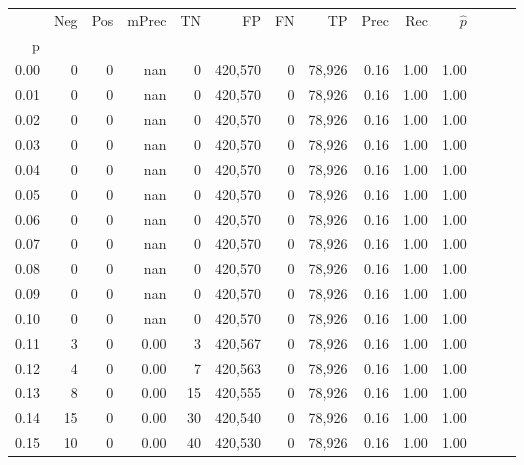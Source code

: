 \begin{tabular}{rrrrrrrrrrrrrr}
\toprule
{} &     Neg &    Pos & mPrec &       TN &       FP &      FN &      TP &  Prec &   Rec & $\hat{p}$ \\
p    &         &        &       &          &          &         &         &       &       &           \\
\midrule
0.00 &       0 &      0 &   nan &        0 &  420,570 &       0 &  78,926 &  0.16 &  1.00 &      1.00 \\
0.01 &       0 &      0 &   nan &        0 &  420,570 &       0 &  78,926 &  0.16 &  1.00 &      1.00 \\
0.02 &       0 &      0 &   nan &        0 &  420,570 &       0 &  78,926 &  0.16 &  1.00 &      1.00 \\
0.03 &       0 &      0 &   nan &        0 &  420,570 &       0 &  78,926 &  0.16 &  1.00 &      1.00 \\
0.04 &       0 &      0 &   nan &        0 &  420,570 &       0 &  78,926 &  0.16 &  1.00 &      1.00 \\
0.05 &       0 &      0 &   nan &        0 &  420,570 &       0 &  78,926 &  0.16 &  1.00 &      1.00 \\
0.06 &       0 &      0 &   nan &        0 &  420,570 &       0 &  78,926 &  0.16 &  1.00 &      1.00 \\
0.07 &       0 &      0 &   nan &        0 &  420,570 &       0 &  78,926 &  0.16 &  1.00 &      1.00 \\
0.08 &       0 &      0 &   nan &        0 &  420,570 &       0 &  78,926 &  0.16 &  1.00 &      1.00 \\
0.09 &       0 &      0 &   nan &        0 &  420,570 &       0 &  78,926 &  0.16 &  1.00 &      1.00 \\
0.10 &       0 &      0 &   nan &        0 &  420,570 &       0 &  78,926 &  0.16 &  1.00 &      1.00 \\
0.11 &       3 &      0 &  0.00 &        3 &  420,567 &       0 &  78,926 &  0.16 &  1.00 &      1.00 \\
0.12 &       4 &      0 &  0.00 &        7 &  420,563 &       0 &  78,926 &  0.16 &  1.00 &      1.00 \\
0.13 &       8 &      0 &  0.00 &       15 &  420,555 &       0 &  78,926 &  0.16 &  1.00 &      1.00 \\
0.14 &      15 &      0 &  0.00 &       30 &  420,540 &       0 &  78,926 &  0.16 &  1.00 &      1.00 \\
0.15 &      10 &      0 &  0.00 &       40 &  420,530 &       0 &  78,926 &  0.16 &  1.00 &      1.00 \\

\end{tabular}
